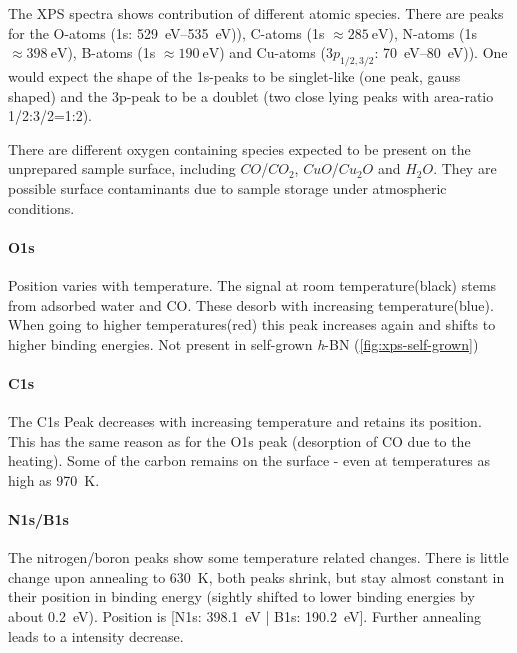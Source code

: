 %

The XPS spectra shows contribution of different atomic species. There are peaks for the O-atoms (1s: \SIrange{529}{535}{\eV})), C-atoms (1s $\approx \SI{285}{\eV}$), N-atoms (1s $\approx \SI{398}{\eV}$), B-atoms (1s $\approx \SI{190}{\eV}$) and Cu-atoms ($3p_{1/2,3/2}$: \SIrange{70}{80}{\eV})). One would expect the shape of the 1s-peaks to be singlet-like (one peak, gauss shaped) and the 3p-peak to be a doublet (two close lying peaks with area-ratio 1/2:3/2=1:2).

There are different oxygen containing species expected to be present on the unprepared sample surface, including $CO$/$CO_2$, $CuO$/$Cu_2O$ and $H_2O$. They are possible surface contaminants due to sample storage under atmospheric conditions.
\paragraph{O1s}
Position varies with temperature. The signal at room temperature(black) stems from adsorbed water and CO. These desorb with increasing temperature(blue). When going to higher temperatures(red) this peak increases again and shifts to higher binding energies. Not present in self-grown \textit{h}-BN (\autoref{fig:xps-self-grown})

\paragraph{C1s}
The C1s Peak decreases with increasing temperature and retains its position. This has the same  reason as for the O1s peak (desorption of CO due to the heating). Some of the carbon remains on the surface - even at temperatures as high as \SI{970}{\K}.

\paragraph{N1s/B1s}
The nitrogen/boron peaks show some temperature related changes. There is little change upon annealing to \SI{630}{\K}, both peaks shrink, but stay almost constant in their position in binding energy (sightly shifted to lower binding energies by about \SI{0.2}{\eV}). Position is [N1s: \SI{398.1}{\eV} | B1s: \SI{190.2}{\eV}]. Further annealing leads to a intensity decrease.

